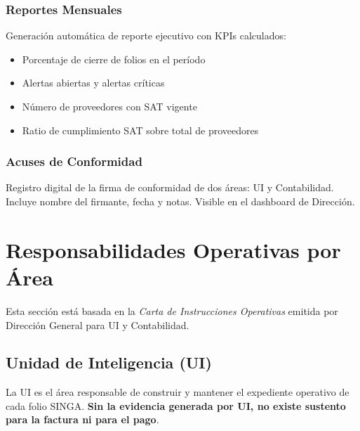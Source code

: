\documentclass[12pt,a4paper]{article}
\begin{document}
\subsubsection{Reportes Mensuales}

Generaci\'on autom\'atica de reporte ejecutivo con KPIs calculados:
\begin{itemize}
  \item Porcentaje de cierre de folios en el per\'iodo
  \item Alertas abiertas y alertas cr\'iticas
  \item N\'umero de proveedores con SAT vigente
  \item Ratio de cumplimiento SAT sobre total de proveedores
\end{itemize}

\subsubsection{Acuses de Conformidad}

Registro digital de la firma de conformidad de dos \'areas: UI y Contabilidad.
Incluye nombre del firmante, fecha y notas. Visible en el dashboard de Direcci\'on.

\newpage

\section{Responsabilidades Operativas por \'Area}

Esta secci\'on est\'a basada en la \textit{Carta de Instrucciones Operativas} emitida
por Direcci\'on General para UI y Contabilidad.

\subsection{Unidad de Inteligencia (UI)}

La UI es el \'area responsable de construir y mantener el expediente operativo de cada
folio SINGA. \textbf{Sin la evidencia generada por UI, no existe sustento para la
factura ni para el pago}.
\end{document}
